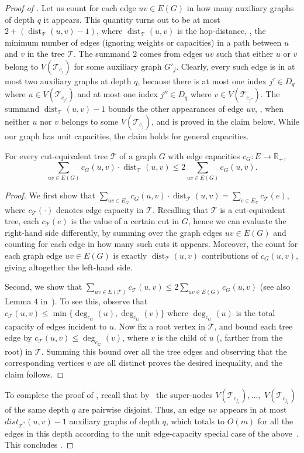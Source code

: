 \documentclass{toc}
\theoremstyle{plain}
\DeclareMathOperator{\dist}{dist}
\newcommand{\T}{\mathcal{T}}
\newcommand{\TG}{\mathcal{T}^*}
\begin{document}
\begin{proof}[Proof of ]
Let us count for each edge $uv\in E(G)$ in how many auxiliary graphs
of depth $q$ it appears.
This quantity turns out to be at most $2+(\dist_{\T}(u,v)-1)$,
where $\dist_{\T}(u,v)$ is the hop-distance,
\ie, the minimum number of edges (ignoring weights or capacities)
in a path between $u$ and $v$ in the tree $\T$.
The summand $2$ comes from edges $uv$ such that either $u$ or $v$
belong to $V({\T_{c_j}})$ for some auxiliary graph $G'_j$.
Clearly, every such edge is in at most two auxiliary graphs at depth $q$,
because there is at most one index $j'\in D_q$ where $u\in V({\T_{c_{j'}}})$
and at most one index $j''\in D_q$ where $v\in V({\T_{c_{j''}}})$.
The summand $\dist_{\T}(u,v)-1$ bounds the other appearances of edge $uv$,
\ie, when neither $u$ nor $v$ belongs to some $V({\T_{c_j}})$,
and is proved in the claim below.
While our graph has unit capacities, the claim holds for general capacities.

\begin{claim}\label{claim:technical}
For every cut-equivalent tree $\T$ of a graph $G$ with edge capacities $c_G:E\rightarrow \mathbb{R}_+$,
$$
\sum_{uv\in E(G)} c_G(u,v)\cdot\dist_{\T}(u,v)\leq 2\sum_{uv\in E(G)} c_G(u,v).
$$
\end{claim}

\begin{proof}
  We first show that $\sum_{uv\in E_{G}} c_G(u,v)\cdot\dist_{\T}(u,v) = \sum_{e\in E_{\T}} c_{\T}(e)$,
  where $c_{\T}(\cdot)$ denotes edge capacity in $\T$.
  Recalling that $\T$ is a cut-equivalent tree,
  each $c_{\T}(e)$ is the value of a certain cut in $G$,
  hence we can evaluate the right-hand side differently,
  by summing over the graph edges $uv\in E(G)$
  and counting for each edge in how many such cuts it appears.
  Moreover, the count for each graph edge $uv\in E(G)$
  is exactly $\dist_{\T}(u,v)$ contributions of $c_G(u,v)$,
  giving altogether the left-hand side.

  Second, we show that $\sum_{uv\in E(\T)} c_{\T}(u,v)\leq 2\sum_{uv\in E(G)} c_G(u,v)$ (see also Lemma $4$ in~\cite{BHKP07}).
  To see this, observe that $c_{\T}(u,v)\leq \min\{\deg_{c_G}(u), \deg_{c_G}(v)\}$
  where $\deg_{c_G}(u)$ is the total capacity of edges incident to $u$.
  Now fix a root vertex in $\T$,
  and bound each tree edge by $c_{\T}(u,v)\leq \deg_{c_G}(v)$,
  where $v$ is the child of $u$ (\ie, farther from the root) in $\T$.
  Summing this bound over all the tree edges and observing that the corresponding vertices $v$ are all distinct proves the desired inequality,
  and the claim follows.
\end{proof}

To complete the proof of ,
recall that by~ the super-nodes $V(\T_{c_{j_1}}),\ldots,$ $V(\T_{c_{j_2}})$ of the same depth $q$ are pairwise disjoint. Thus, an edge $uv$ appears in at most $dist_{\TG}(u,v)-1$ auxiliary graphs of depth $q$,
which totals to $O(m)$ for all the edges in this depth according to the unit edge-capacity special case of the above~.
This concludes .
\end{proof}
\end{document}
